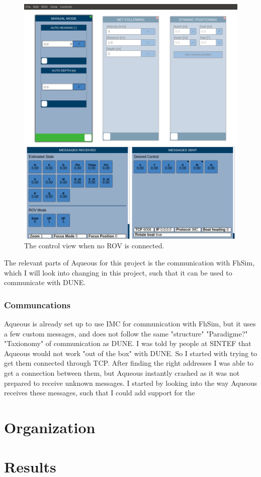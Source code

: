 \documentclass{article}
\begin{document}
\begin{figure}[H]
    \centering
    \includegraphics[width=\textwidth]{AqControl.png}
    \caption{The control view when no ROV is connected.}
    \label{fig:control}
\end{figure}
\noindent
The relevant parts of Aqueous for this project is the communication with FhSim, which I will look into changing in this project, such that it can be used to communicate with DUNE.
\subsubsection{Communcations}
Aqueous is already set up to use IMC for communication with FhSim, but it uses a few custom messages, and does not follow the same "structure" "Paradigme?" "Taxionomy" of communication as DUNE.
I was told by people at SINTEF that Aqueous would not work "out of the box" with DUNE. 
So I started with trying to get them connected through TCP. 
After finding the right addresses I was able to get a connection between them, but Aqueous instantly crashed as it was not prepared to receive unknown messages.
I started by looking into the way Aqueous receives these messages, such that I could add support for the 


\section{Organization}

\section{Results}


% 
\end{document}
